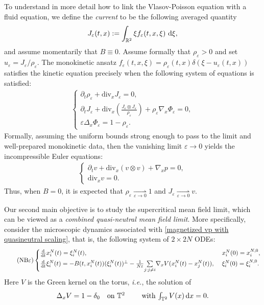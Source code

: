\documentclass[11pt,reqno]{amsart}
\numberwithin{equation}{section}
\def\dd{{\rm d}}
\begin{document}
To understand in more detail how to link the Vlasov-Poisson equation with a fluid equation, we  define the \textit{current} to be the following averaged quantity 
\begin{align}
J_{\varepsilon}(t,x):=\int_{\mathbb{R}^{2}}\xi f_{\varepsilon}(t,x,\xi)\ \dd \xi, \label{definition of current}    
\end{align}
and assume momentarily that $B\equiv 0$. Assume formally that $\rho_\varepsilon>0$ and set $u_\varepsilon=J_\varepsilon/\rho_\varepsilon$.  The monokinetic ansatz $f_\varepsilon(t,x,\xi)=\rho_\varepsilon(t,x)\delta(\xi-u_\varepsilon(t,x))$ satisfies the kinetic equation precisely when the following system of equations is satisfied: 
\begin{align*}
\begin{cases}
\partial_{t}\rho_{\varepsilon}+\mathrm{div}_{x}J_{\varepsilon}=0,\\
\partial_{t}J_{\varepsilon}+\mathrm{div}_{x}(\frac{J_{\varepsilon}\otimes J_{\varepsilon}}{\rho_{\varepsilon}})+\rho_{\varepsilon}\nabla_{x}\Phi_{\varepsilon}=0,\\
\varepsilon\Delta_{x}\Phi_{\varepsilon}=1-\rho_{\varepsilon}. 
\end{cases}    
\end{align*}
Formally, assuming the uniform bounds strong enough to pass 
to the limit and well-prepared monokinetic data, 
then the vanishing limit $\varepsilon\to0$ 
yields the incompressible Euler equations:
\begin{align}\tag{E}
\begin{cases}
\partial_{t}v+\mathrm{div}_{x}(v\otimes v)+\nabla_{x} p=0, \\
\mathrm{div}_{x}v=0. 
\end{cases}  
\label{incompressible Euler}
\end{align}
Thus, when $B=0$, it is expected 
that 
$\rho_{\varepsilon}\underset{\varepsilon \rightarrow 0}{\rightharpoonup}1$
and $J_{\varepsilon}\underset{\varepsilon \rightarrow 0}{\rightharpoonup}v$.

\smallskip
Our second main objective is to study the supercritical mean field limit, which can be viewed as a \textit{combined quasi-neutral mean field limit}. More specifically, consider the microscopic dynamics associated with \eqref{magnetized vp with quasineutral scaling}, that is, the following system of $2\times 2N$ ODEs: 
\vspace{2pt}
\begin{align}\tag{NB$\varepsilon$}
 \begin{cases}
\frac{\dd}{\dd t}x_{i}^{N}(t)=\xi_{i}^{N}(t), &\,\, x_{i}^{N}(0)=x_{i}^{N,0},\\[1mm]
\frac{\dd}{\dd t}\xi_{i}^{N}(t)=-B(t,x_{i}^{N}(t))(\xi_{i}^{N}(t))^{\perp}-\frac{1}{N\varepsilon}\underset{j:j\neq i}{\sum}\nabla_{x} V(x_{i}^{N}(t)-x_{j}^{N}(t)),
&\,\,\xi_{i}^{N}(0)=\xi_{i}^{N,0}. 
\end{cases} 
\label{trajectories intro}
\end{align}
Here $V$ is the Green kernel on the torus, {\it i.e.}, the solution of 
$$
\Delta_{x}V=1-\delta_{0} 
\quad \mbox{on $\mathbb{T}^{2}\qquad$  \text{with} $\int_{\mathbb{T}^{2}}V(x)\, \dd x=0$}.$$
\end{document}

